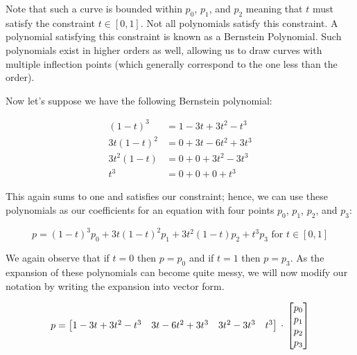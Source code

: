 \documentclass[12pt,letterpaper]{article}
\begin{document}
Note that such a curve is bounded within $p_{0}$, $p_{1}$, and $p_{2}$ meaning that $t$ must satisfy the constraint $t \in [0, 1]$. Not all polynomials satisfy this constraint. A polynomial satisfying this constraint is known as a Bernstein Polynomial. Such polynomials exist in higher orders as well, allowing us to draw curves with multiple inflection points (which generally correspond to the one less than the order).

Now let's suppose we have the following Bernstein polynomial:

\begin{equation}
    \begin{aligned}
    	(1 - t)^{3} &= 1 - 3t + 3t^{2} - t^{3} \\
    	3t(1-t)^{2} &= 0 + 3t - 6t^{2} + 3t^{3} \\
    	3t^{2}(1-t) &= 0 + 0 + 3t^{2} - 3t^{3} \\
    	t^{3} &= 0 + 0 + 0 + t^{3}
    \end{aligned}
\end{equation}

This again sums to one and satisfies our constraint; hence, we can use these polynomials as our coefficients for an equation with four points $p_{0}$, $p_{1}$, $p_{2}$, and $p_{3}$:

\begin{equation}
\label{eqn:bernstein-4}
    p = (1 - t)^{3}p_{0} + 3t(1-t)^{2}p_{1} + 3t^{2}(1-t)p_{2} + t^{3}p_{3} \text{ for } t \in [0, 1]
\end{equation}

We again observe that if $t = 0$ then $p = p_{0}$ and if $t = 1$ then $p = p_{3}$. As the expansion of these polynomials can become quite messy, we will now modify our notation by writing the expansion into vector form. 

\begin{equation}
    p = \begin{bmatrix} 1 - 3t + 3t^{2} - t^{3} & 3t - 6t^{2} + 3t^{3} & 3t^{2} - 3t^{3} & t^{3} \end{bmatrix} \\
    \cdot \\
    \begin{bmatrix} p_{0} \\ p_{1} \\ p_{2} \\ p_{3} \end{bmatrix}
\end{equation}
\end{document}
